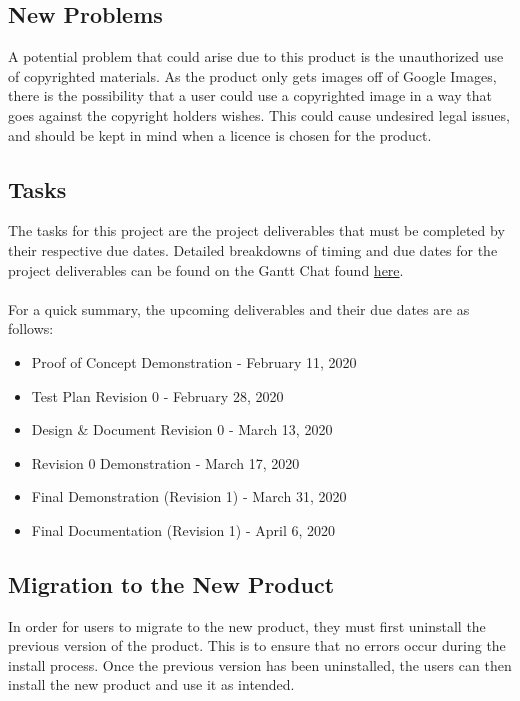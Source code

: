 \documentclass[12pt, titlepage]{article}
\begin{document}
\subsection{New Problems}

A potential problem that could arise due to this product is the unauthorized use of copyrighted materials. As the product only gets images off of Google Images, there is the possibility that a user could use a copyrighted image in a way that goes against the copyright holders wishes. This could cause undesired legal issues, and should be kept in mind when a licence is chosen for the product.

\subsection{Tasks}

The tasks for this project are the project deliverables that must be completed by their respective due dates. Detailed breakdowns of timing and due dates for the project deliverables can be found on the Gantt Chat found \href{https://gitlab.cas.mcmaster.ca/guinnesj/google-images-downloader/blob/master/ProjectSchedule/Gantt-Chart.pdf}{here}. 
\\ \\
For a quick summary, the upcoming deliverables and their due dates are as follows:
\begin{itemize}
    \item Proof of Concept Demonstration - February 11, 2020
    \item Test Plan Revision 0 - February 28, 2020
    \item Design \& Document Revision 0 - March 13, 2020
    \item Revision 0 Demonstration - March 17, 2020
    \item Final Demonstration (Revision 1) - March 31, 2020
    \item Final Documentation (Revision 1) - April 6, 2020
\end{itemize}

\subsection{Migration to the New Product}

In order for users to migrate to the new product, they must first uninstall the previous version of the product. This is to ensure that no errors occur during the install process. Once the previous version has been uninstalled, the users can then install the new product and use it as intended.
\end{document}
